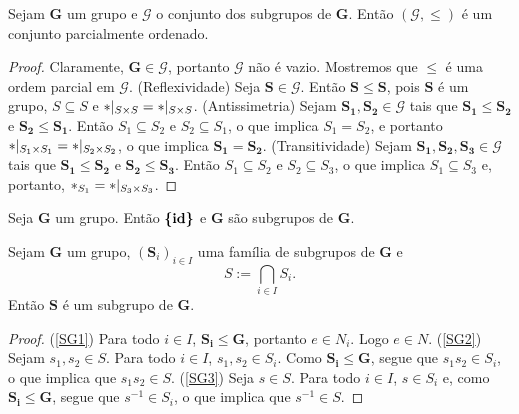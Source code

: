 \begin{prop}
Sejam $\bm G$ um grupo e $\mathcal G$ o conjunto dos subgrupos de $\bm G$. Então $(\mathcal G,\leq)$ é um conjunto parcialmente ordenado.
\end{prop}
\begin{proof}
Claramente, $\bm G \in \mathcal G$, portanto $\mathcal G$ não é vazio. Mostremos que $\leq$ é uma ordem parcial em $\mathcal G$. (Reflexividade) Seja $\bm S \in \mathcal G$. Então $\bm S \leq \bm S$, pois $\bm S$ é um grupo, $S \subseteq S$ e $\ast|_{S \times S} = \ast|_{S \times S}$. (Antissimetria) Sejam $\bm{S_1},\bm{S_2} \in \mathcal G$ tais que $\bm{S_1} \leq \bm{S_2}$ e $\bm{S_2} \leq \bm{S_1}$. Então $S_1 \subseteq S_2$ e $S_2 \subseteq S_1$, o que implica $S_1=S_2$, e portanto $\ast|_{S_1 \times S_1} = \ast|_{S_2 \times S_2}$, o que implica $\bm{S_1} = \bm{S_2}$. (Transitividade) Sejam  $\bm{S_1},\bm{S_2},\bm{S_3} \in \mathcal G$ tais que $\bm{S_1} \leq \bm{S_2}$ e $\bm{S_2} \leq \bm{S_3}$. Então $S_1 \subseteq S_2$ e $S_2 \subseteq S_3$, o que implica $S_1 \subseteq S_3$ e, portanto, $\ast_{S_1} = \ast|_{S_3 \times S_3}$.
\end{proof}

\begin{prop}
\label{alge:prop.subgru.triv}
Seja $\bm G$ um grupo. Então $\bm{\{\mathrm{id}\}}$ e $\bm G$ são subgrupos de $\bm G$.
\end{prop}

\begin{prop}
\label{alge:prop.subgru.inter}
Sejam $\bm G$ um grupo, $(\bm S_i)_{i \in I}$ uma família de subgrupos de $\bm G$ e
	\begin{equation*}
	S := \bigcap_{i \in I} S_i.
	\end{equation*}
Então $\bm S$ é um subgrupo de $\bm G$.
\end{prop}
\begin{proof}
(\ref{SG1}) Para todo $i \in I$, $\bm{S_i}\leq \bm G$, portanto $e \in N_i$. Logo $e \in N$. (\ref{SG2}) Sejam $s_1, s_2 \in S$. Para todo $i \in I$, $s_1,s_2 \in S_i$. Como $\bm{S_i} \leq \bm G$, segue que $s_1s_2 \in S_i$, o que implica que $s_1s_2 \in S$. (\ref{SG3}) Seja $s \in S$. Para todo $i \in I$, $s \in S_i$ e, como $\bm{S_i} \leq \bm{G}$, segue que $s^{-1} \in S_i$, o que implica que $s^{-1} \in S$.
\end{proof}

